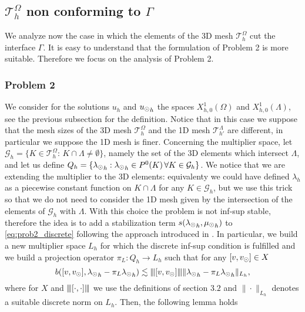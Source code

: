 \def\patch{\omega _j}
\subsection{$\mathcal{T}^{\Omega}_h$ non conforming to $\Gamma$}\label{sec:unfit2}
We analyze now the case in which the elements of the 3D mesh $\mathcal{T}^{\Omega}_h$ cut the interface $\Gamma$. It is easy to understand that the formulation of Problem 2 is more suitable. 
Therefore we focus on the analysis of Problem 2.

\subsubsection{Problem 2} We consider for the solutions $u_h$ and ${u_{\odot}}_h$ the spaces $X_{h,0}^1(\Omega)$ and $X_{h,0}^1(\Lambda)$, see the previous subsection for the definition. Notice that in this case we suppose that the mesh sizes of the 3D mesh $\mathcal{T}^{\Omega}_h$ and the 1D mesh $\mathcal{T}^{\Lambda}_{h'}$ are different, in particular we suppose the 1D mesh is finer. Concerning the multiplier space, let $\mathcal{G}_h = \{K \in \mathcal{T}^{\Omega}_h: \, K\cap \Lambda \neq \emptyset\}$, namely the set of the 3D elements which intersect $\Lambda$, and let us define $Q_h=\{{\lambda_{\odot}}_h : {\lambda_{\odot}}_h \in P^0(K) \, \forall K \in \mathcal{G}_h\}$. We notice that we are extending the multiplier to the 3D elements: equivalenty we could have defined $\lambda_h$ as a piecewise constant function on $K\cap \Lambda$ for any $K \in \mathcal{G}_h$, but we use this trick so that we do not need to consider the 1D mesh given by the intersection of the elements of $\mathcal{G}_h$ with $\Lambda$. With this choice the problem is not inf-sup stable, therefore the idea is to add a stabilization term $s({\lambda_{\odot}}_h, {\mu_{\odot}}_h)$ to \eqref{eq:prob2_discrete} following the approach introduced in \cite{burman2014}. In particular, we build a new multiplier space $L_h$ for which the discrete inf-sup condition is fulfilled and we build a projection operator $\pi_L: Q_h \rightarrow L_h$ such that for any $[v, v_{\odot}] \in X $
\begin{equation}\label{condition_pi_L}
b([v, \vd], {\ld}_h - \pi_L {\ld}_h) \lesssim \vertiii{[v,\vd]}\|{\ld}_h - \pi_L {\ld}_h\|_{L_h},
\end{equation}
where for $X$ and ${\left\vert\kern-0.25ex\left\vert\kern-0.25ex\left\vert [\cdot, \cdot] \right\vert\kern-0.25ex\right\vert\kern-0.25ex\right\vert}$ we use the definitions of section $3.2$ and $\|\cdot \|_{L_h}$ denotes a suitable discrete norm on $L_h$. Then, the following lemma holds
